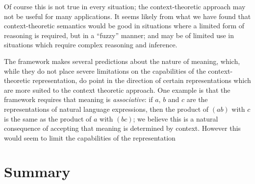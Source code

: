 Of course this is not true in every situation; the context-theoretic approach may not be useful for many applications. It seems likely from what we have found that context-theoretic semantics would be good in situations where a limited form of reasoning is required, but in a ``fuzzy'' manner; and may be of limited use in situations which require complex reasoning and inference.

 
The framework makes several predictions about the nature of meaning, which, while they do not place severe limitations on the capabilities of the context-theoretic representation, do point in the direction of certain representations which are more suited to the context theoretic approach. One example is that the framework requires that meaning is \emph{associative}: if $a$, $b$ and $c$ are the representations of natural language expressions, then the product of $(ab)$ with $c$ is the same as the product of $a$ with $(bc)$; we believe this is a natural consequence of accepting that meaning is determined by context. However this would seem to limit the capabilities of the representation
 


 \section{Summary}
 